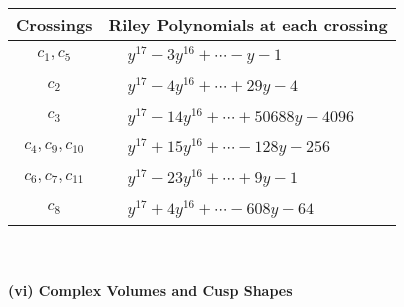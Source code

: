 \documentclass[1p]{elsarticle_modified}
\theoremstyle{definition}
\begin{document}
\begin{tabular}{m{50pt}|m{274pt}}
Crossings & \hspace{64pt}Riley Polynomials at each crossing \\
\hline $$\begin{aligned}c_{1},c_{5}\end{aligned}$$&$\begin{aligned}
&y^{17}-3 y^{16}+\cdots- y-1
\end{aligned}$\\
\hline $$\begin{aligned}c_{2}\end{aligned}$$&$\begin{aligned}
&y^{17}-4 y^{16}+\cdots+29 y-4
\end{aligned}$\\
\hline $$\begin{aligned}c_{3}\end{aligned}$$&$\begin{aligned}
&y^{17}-14 y^{16}+\cdots+50688 y-4096
\end{aligned}$\\
\hline $$\begin{aligned}c_{4},c_{9},c_{10}\end{aligned}$$&$\begin{aligned}
&y^{17}+15 y^{16}+\cdots-128 y-256
\end{aligned}$\\
\hline $$\begin{aligned}c_{6},c_{7},c_{11}\end{aligned}$$&$\begin{aligned}
&y^{17}-23 y^{16}+\cdots+9 y-1
\end{aligned}$\\
\hline $$\begin{aligned}c_{8}\end{aligned}$$&$\begin{aligned}
&y^{17}+4 y^{16}+\cdots-608 y-64
\end{aligned}$\\
\hline
\end{tabular}\\~\\
\newpage\flushleft \textbf{(vi) Complex Volumes and Cusp Shapes}
\end{document}
